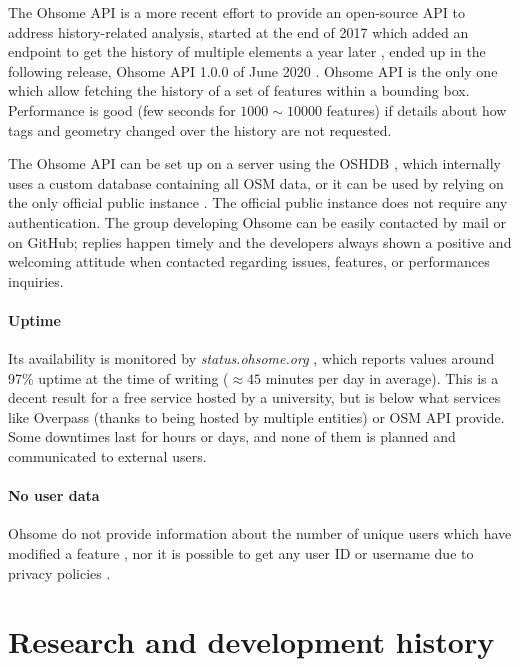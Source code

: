\documentclass{Configuration_Files/PoliMi3i_thesis}
\begin{document}
The Ohsome API \cite{WelcomeDocumentationOhsome} is a more recent effort to provide an open-source API to address history-related analysis, started at the end of 2017 \cite{InitialCommitGIScience} which added an endpoint to get the history of multiple elements a year later \cite{ImplementingElementsFullHistoryGIScience}, ended up in the following release, Ohsome API 1.0.0 of June 2020 \cite{ReleaseVersionGIScience}. Ohsome API is the only one which allow fetching the history of a set of features within a bounding box. Performance is good (few seconds for $ 1000 \sim 10000 $ features) if details about how tags and geometry changed over the history are not requested.

The Ohsome API can be set up on a server using the OSHDB \cite{raiferOSHDBOpenStreetMapHistory2021}, which internally uses a custom database containing all OSM data, or it can be used by relying on the only official public instance \cite{SwaggerUI}. The official public instance does not require any authentication. The group developing Ohsome can be easily contacted by mail or on GitHub; replies happen timely and the developers always shown a positive and welcoming attitude when contacted regarding issues, features, or performances inquiries.

\subsubsection{Uptime}

Its availability is monitored by \textit{status.ohsome.org} \cite{StatusOhsomeOrg}, which reports values around 97\% uptime at the time of writing ($ \approx 45 $ minutes per day in average). This is a decent result for a free service hosted by a university, but is below what services like Overpass (thanks to being hosted by multiple entities) or OSM API provide. Some downtimes last for hours or days, and none of them is planned and communicated to external users.

\subsubsection{No user data}

Ohsome do not provide information about the number of unique users which have modified a feature \cite{AddUsersCount}, nor it is possible to get any user ID or username due to privacy policies \cite{OSMFLicenceWorking}.

\chapter{Research and development history}
\label{ch:research_and_development_history}%
\end{document}
